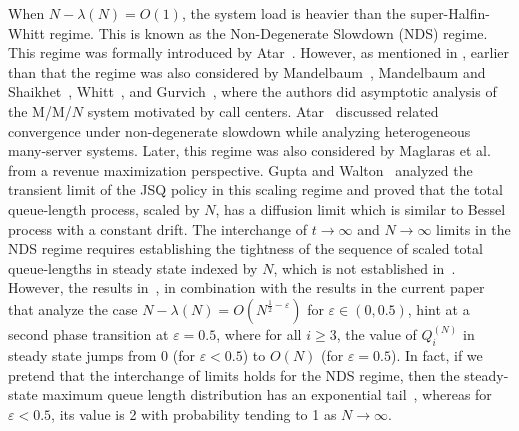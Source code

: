 \documentclass[11pt, reqno]{article}
\numberwithin{equation}{section}
\numberwithin{theorem}{section}
\newcommand\blue[1]{#1}
\begin{document}
When $N-\lambda(N) = O(1)$, the system load is heavier \blue{than} the super-Halfin-Whitt regime. This is known as the Non-Degenerate Slowdown (NDS) regime.
\blue{This regime was formally introduced by Atar~\cite{Atar12}. However, as mentioned in \cite{Atar12}, earlier than that the regime was also considered by Mandelbaum~\cite{AM08}, Mandelbaum and Shaikhet~\cite{MS04ab}, Whitt~\cite{ww03}, and Gurvich~\cite{IG04}, where the authors did asymptotic analysis of the M/M/$N$ system motivated by call centers. 
Atar~\cite{Atar12} discussed related convergence under non-degenerate slowdown while analyzing heterogeneous many-server systems.}
Later, this regime was also considered by Maglaras et al.~\cite{MYZ18} from a revenue maximization perspective.
Gupta and Walton~\cite{GW19} analyzed the transient limit of the JSQ policy in this scaling regime and proved that the total queue-length process, scaled by $N$, has a diffusion limit which is similar to Bessel process with a constant drift.
The interchange of $t\to\infty$ and $N\to\infty$ limits in the NDS regime requires establishing the tightness of the sequence of scaled total queue-lengths in steady state indexed by $N$, which is not established in~\cite{GW19}. 
However, the results in~\cite{GW19}, in combination with the results in the current paper that analyze the case $N- \lambda(N) = O(N^{\frac{1}{2} - \varepsilon})$ for $\varepsilon \in (0, 0.5)$, hint at a second phase transition at $\varepsilon = 0.5$, where for all $i\geq 3$, the value of $Q_i^{(N)}$ in steady state jumps from 0 (for $\varepsilon < 0.5$) to $O(N)$ (for $\varepsilon = 0.5$).
In fact, if we pretend that the interchange of limits holds for the NDS regime, then the steady-state maximum queue length distribution has an exponential tail~\cite[Theorem 1]{GW19},  whereas for $\varepsilon < 0.5$, its value is 2 with probability tending to 1 as $N\to\infty$.
\end{document}
